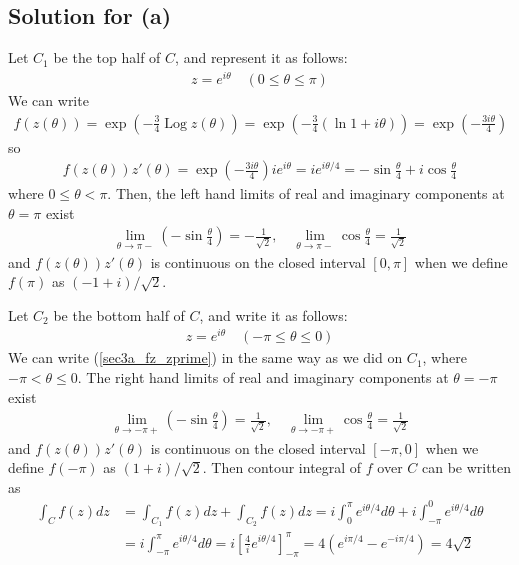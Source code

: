 \documentclass{scrartcl}
\begin{document}
\subsection{Solution for (a)}
Let \(C_1\) be the top half of \(C\), and represent it as follows:
\begin{align*}
  z = e^{i\theta} \quad (0 \leq \theta \leq \pi)
\end{align*}
We can write
\begin{align*}
  f(z(\theta)) = \exp \left( -\frac{3}{4} \operatorname{Log} z(\theta) \right) = \exp \left( -\frac{3}{4} (\ln 1 + i\theta) \right) = \exp \left( -\frac{3i\theta}{4} \right)
\end{align*}
so
\begin{align}\label{sec3a_fz_zprime}
  f(z(\theta)) z'(\theta) = \exp \left( -\frac{3i\theta}{4} \right) ie^{i\theta} = ie^{i\theta / 4} = -\sin \frac{\theta}{4} + i\cos \frac{\theta}{4}
\end{align}
where \(0 \leq \theta < \pi\).
Then, the left hand limits of real and imaginary components at \(\theta = \pi\) exist
\begin{align*}
  \lim_{\theta \to \pi-} \left( -\sin \frac{\theta}{4} \right) = -\frac{1}{\sqrt{2}}, \quad \lim_{\theta \to \pi-} \cos \frac{\theta}{4} = \frac{1}{\sqrt{2}}
\end{align*}
and \(f(z(\theta)) z'(\theta)\) is continuous on the closed interval \([0, \pi]\) when we define \(f(\pi)\) as \((-1 + i) / \sqrt{2}\).

Let \(C_2\) be the bottom half of \(C\), and write it as follows:
\begin{align*}
  z = e^{i\theta} \quad (-\pi \leq \theta \leq 0)
\end{align*}
We can write (\ref{sec3a_fz_zprime}) in the same way as we did on \(C_1\), where \(-\pi < \theta \leq 0\).
The right hand limits of real and imaginary components at \(\theta = -\pi\) exist
\begin{align*}
  \lim_{\theta \to -\pi+} \left( -\sin \frac{\theta}{4} \right) = \frac{1}{\sqrt{2}}, \quad \lim_{\theta \to -\pi+} \cos \frac{\theta}{4} = \frac{1}{\sqrt{2}}
\end{align*}
and \(f(z(\theta)) z'(\theta)\) is continuous on the closed interval \([-\pi, 0]\) when we define \(f(-\pi)\) as \((1 + i) / \sqrt{2}\).
Then contour integral of \(f\) over \(C\) can be written as
\begin{align*}
  \int_C f(z) dz &= \int_{C_1} f(z) dz + \int_{C_2} f(z) dz = i \int^{\pi}_0 e^{i\theta / 4} d\theta + i \int^0_{-\pi} e^{i\theta / 4} d\theta \\
                 &= i \int^{\pi}_{-\pi} e^{i\theta / 4} d\theta = i \left[ \frac{4}{i} e^{i\theta / 4} \right]^\pi_{-\pi} = 4(e^{i\pi / 4} - e^{-i\pi / 4}) = 4\sqrt{2}
\end{align*}
\end{document}
